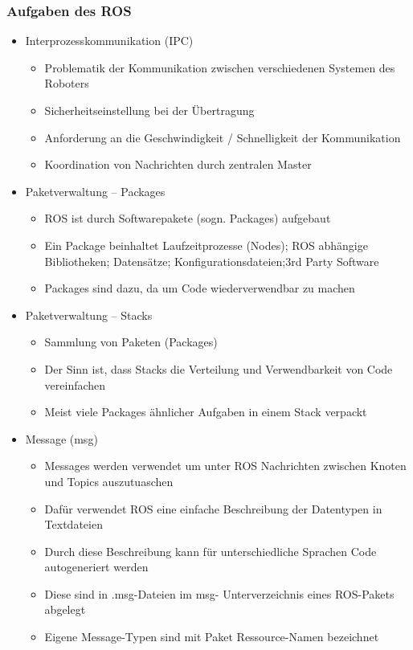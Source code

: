 \subsubsection{Aufgaben des ROS}
\begin{itemize}
 \item Interprozesskommunikation (IPC)
 \begin{itemize}
\item Problematik der Kommunikation zwischen verschiedenen Systemen des Roboters
\item Sicherheitseinstellung bei der Übertragung
\item Anforderung an die Geschwindigkeit / Schnelligkeit der Kommunikation
\item Koordination von Nachrichten durch zentralen Master
\end{itemize}
\item Paketverwaltung – Packages
\begin{itemize}
 \item ROS ist durch Softwarepakete (sogn. Packages) aufgebaut
 \item Ein Package beinhaltet Laufzeitprozesse (Nodes); ROS abhängige Bibliotheken;
Datensätze; Konfigurationsdateien;3rd Party Software
 \item Packages sind dazu, da um Code wiederverwendbar zu machen
\end{itemize}
\item Paketverwaltung – Stacks
\begin{itemize}
\item Sammlung von Paketen (Packages)
\item Der Sinn ist, dass Stacks die Verteilung und Verwendbarkeit von Code
vereinfachen
\item Meist viele Packages ähnlicher Aufgaben in einem Stack verpackt
\end{itemize}
\item Message (msg)
\begin{itemize}
 \item  Messages werden verwendet um unter ROS Nachrichten zwischen Knoten und
Topics auszutuaschen
\item Dafür verwendet ROS eine einfache Beschreibung der Datentypen in Textdateien
\item Durch diese Beschreibung kann für unterschiedliche Sprachen Code autogeneriert
werden
\item Diese sind in .msg-Dateien im msg- Unterverzeichnis eines ROS-Pakets abgelegt
\item Eigene Message-Typen sind mit Paket Ressource-Namen bezeichnet

\end{itemize}
\end{itemize}
